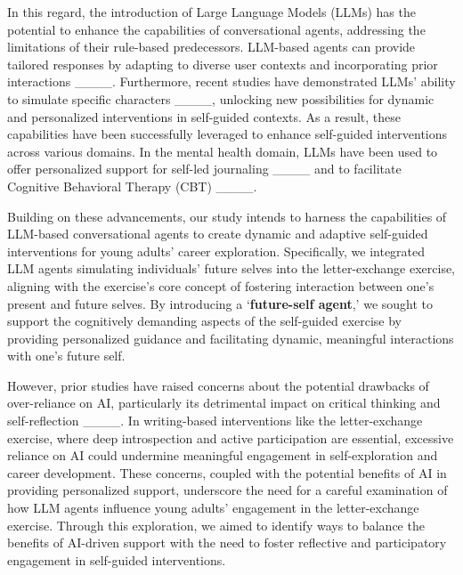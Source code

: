 In this regard, the introduction of Large Language Models (LLMs) has the potential to enhance the capabilities of conversational agents, addressing the limitations of their rule-based predecessors. LLM-based agents can provide tailored responses by adapting to diverse user contexts and incorporating prior interactions ____. Furthermore, recent studies have demonstrated LLMs' ability to simulate specific characters ____, unlocking new possibilities for dynamic and personalized interventions in self-guided contexts. As a result, these capabilities have been successfully leveraged to enhance self-guided interventions across various domains. In the mental health domain, LLMs have been used to offer personalized support for self-led journaling ____ and to facilitate Cognitive Behavioral Therapy (CBT) ____. 


Building on these advancements, our study intends to harness the capabilities of LLM-based conversational agents to create dynamic and adaptive self-guided interventions for young adults' career exploration. Specifically, we integrated LLM agents simulating individuals' future selves into the letter-exchange exercise, aligning with the exercise’s core concept of fostering interaction between one’s present and future selves. By introducing a `\textbf{future-self agent},’ we sought to support the cognitively demanding aspects of the self-guided exercise by providing personalized guidance and facilitating dynamic, meaningful interactions with one’s future self.

However, prior studies have raised concerns about the potential drawbacks of over-reliance on AI, particularly its detrimental impact on critical thinking and self-reflection ____. In writing-based interventions like the letter-exchange exercise, where deep introspection and active participation are essential, excessive reliance on AI could undermine meaningful engagement in self-exploration and career development. These concerns, coupled with the potential benefits of AI in providing personalized support, underscore the need for a careful examination of how LLM agents influence young adults' engagement in the letter-exchange exercise. Through this exploration, we aimed to identify ways to balance the benefits of AI-driven support with the need to foster reflective and participatory engagement in self-guided interventions.



